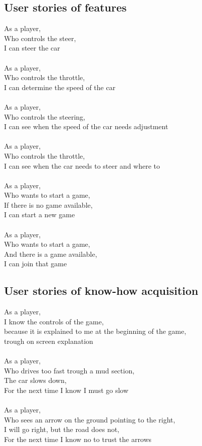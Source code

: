 \documentclass[11pt,twoside,a4paper]{article}
\begin{document}
\subsection{User stories of features}
As a player,\\
Who controls the steer,\\
I can steer the car\\
\\
As a player,\\
Who controls the throttle,\\
I can determine the speed of the car\\
\\
As a player,\\
Who controls the steering,\\
I can see when the speed of the car needs adjustment\\
\\
As a player,\\
Who controls the throttle,\\
I can see when the car needs to steer and where to\\
\\
As a player,\\
Who wants to start a game,\\
If there is no game available,\\
I can start a new game\\
\\
As a player,\\
Who wants to start a game,\\
And there is a game available,\\
I can join that game\\
\subsection{User stories of know-how acquisition}
As a player,\\
I know the controls of the game,\\
because it is explained to me at the beginning of the game,\\
trough on screen explanation\\
\\
As a player,\\
Who drives too fast trough a mud section,\\
The car slows down,\\
For the next time I know I must go slow\\
\\
As a player,\\
Who sees an arrow on the ground pointing to the right,\\
I will go right, but the road does not,\\
For the next time I know no to trust the arrows
\end{document}
